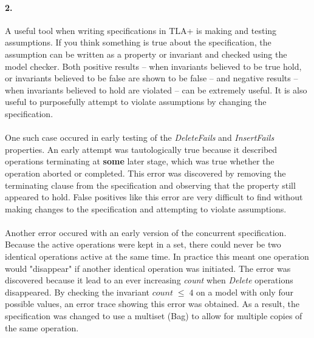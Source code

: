 \documentclass{uit-thesis}
\begin{document}
\paragraph{2.} %
A useful tool when writing specifications in TLA+ is making and testing assumptions. If you think something is true about the specification, the assumption can be written as a property or invariant and checked using the model checker. Both positive results -- when invariants believed to be true hold, or invariants believed to be false are shown to be false -- and negative results -- when invariants believed to hold are violated -- can be extremely useful. It is also useful to purposefully attempt to violate assumptions by changing the specification.
\\\\
One such case occured in early testing of the \textit{DeleteFails} and \textit{InsertFails} properties. An early attempt was tautologically true because it described operations terminating at \textbf{some} later stage, which was true whether the operation aborted or completed. This error was discovered by removing the terminating clause from the specification and observing that the property still appeared to hold. False positives like this error are very difficult to find without making changes to the specification and attempting to violate assumptions.
\\\\
Another error occured with an early version of the concurrent specification. Because the active operations were kept in a set, there could never be two identical operations active at the same time. In practice this meant one operation would "disappear" if another identical operation was initiated. The error was discovered because it lead to an ever increasing \textit{count} when \textit{Delete} operations disappeared. By checking the invariant $count \; \leq \; 4$ on a model with only four possible values, an error trace showing this error was obtained. As a result, the specification was changed to use a multiset (Bag) to allow for multiple copies of the same operation.
\end{document}
